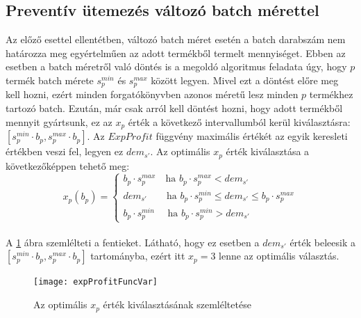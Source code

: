 \subsection{Preventív ütemezés változó batch mérettel} \label{variable_batch_size_modell}
Az előző esettel ellentétben, változó batch méret esetén a batch darabszám nem határozza meg egyértelműen az adott termékből termelt mennyiséget. 
Ebben az esetben a batch méretről való döntés is a megoldó algoritmus feladata úgy, hogy $p$ termék batch mérete $s_p^{min}$ és $s_p^{max}$ között legyen.
Mivel ezt a döntést előre meg kell hozni, ezért minden forgatókönyvben azonos méretű lesz minden $p$ termékhez tartozó batch.
Ezután, már csak arról kell döntést hozni, hogy adott termékből mennyit gyártsunk, ez az $x_p$ érték a következő intervallumból kerül kiválasztásra: $[s_p^{min} \cdot b_p , s_p^{max} \cdot b_p]$.
Az $ExpProfit$ függvény maximális értékét az egyik keresleti értékben veszi fel, legyen ez $dem_{s'}$.
Az optimális $x_p$ érték kiválasztása a következőképpen tehető meg:
\begin{equation*}
x_{p}(b_p)= \begin{cases}
            b_p \cdot s_p^{max} \quad \text{ha } b_p \cdot s_p^{max}<dem_{s'}\\
            dem_{s'} \qquad \text{ha } b_p \cdot s_p^{min} \leq dem_{s'} \leq b_p \cdot s_p^{max}\\
            b_p \cdot s_p^{min} \quad \text{ ha } b_p \cdot s_p^{min}>dem_{s'}
       \end{cases}       
\end{equation*}\\
A \ref{expProfit_func_var} ábra szemlélteti a fentieket. Látható, hogy ez esetben a $dem_{s'}$ érték beleesik a \\$[s_p^{min} \cdot b_p , s_p^{max} \cdot b_p]$ tartományba, ezért itt $x_p=3$ lenne az optimális választás.
\begin{figure}
\begin{center}
\texttt{[image: expProfitFuncVar]}
\caption{Az optimális $x_p$ érték kiválasztásának szemléltetése}
\label{expProfit_func_var}
\end{center}
\end{figure}
